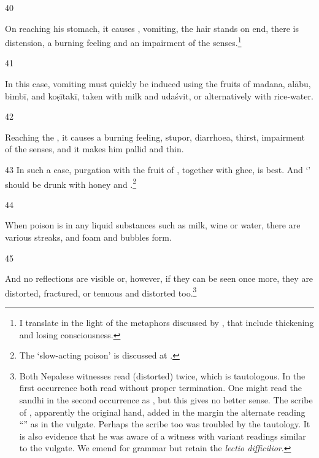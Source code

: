 \begin{translation}
     \item[40]
     
     On reaching his stomach, it causes , vomiting, the hair
stands on end, there is distension, a burning feeling and an impairment of
the senses.\footnote{I translate  in the light of the metaphors
discussed by \citet{meul-2011}, that include thickening and losing
consciousness.}

     \item[41] 
     
In this case, vomiting must quickly be induced using the fruits of
\gls{madana}, %
\gls{alābu}, %
\gls{bimbī}, %
and \gls{koṣītakī}, %
taken with milk and \gls{udaśvit}, or alternatively with
rice-water.
     
     \item[42]
     
    
 Reaching the , it causes a burning feeling, stupor,
diarrhoea, thirst, impairment of the senses,  and it makes
him pallid and thin.
    
    
      \item [43]
In such a case, purgation with the fruit of , 
together with ghee, is best.  And  `'
should be drunk with honey and .\footnote{The `slow-acting
poison' is discussed at .}
     
     \item[44]
     
     When poison is in any liquid substances such as milk, wine or water, there are
     various streaks, and foam and bubbles form.  

     \item[45]
     
      And no reflections are visible or,
however, if they can be seen once more, they are distorted, fractured, or
tenuous and distorted too.\footnote{Both Nepalese witnesses read
 ({distorted}) twice, which is tautologous.  In the first occurrence
both read  without proper termination.  One might read the sandhi
in the second occurrence as , but this gives
no better sense. The scribe of , apparently the
original hand,  added in the margin the alternate reading
“” as in the vulgate. Perhaps the scribe too was troubled
by the tautology.  It is also evidence that he was aware of a witness with
variant readings similar to the vulgate. We emend for grammar but retain the
\emph{lectio difficilior}.} 
     

\end{translation}
